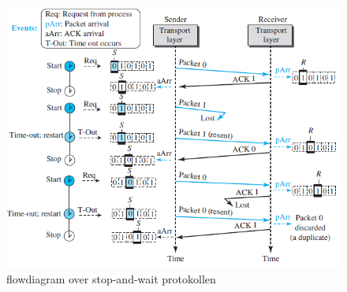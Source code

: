 \begin{figure}[h]
\centering
\includegraphics[scale=0.75]{Billeder/StopAndWaitFlow.png}
\caption{flowdiagram over stop-and-wait protokollen
\label{StopAndWaitFlow}}
\end{figure}

